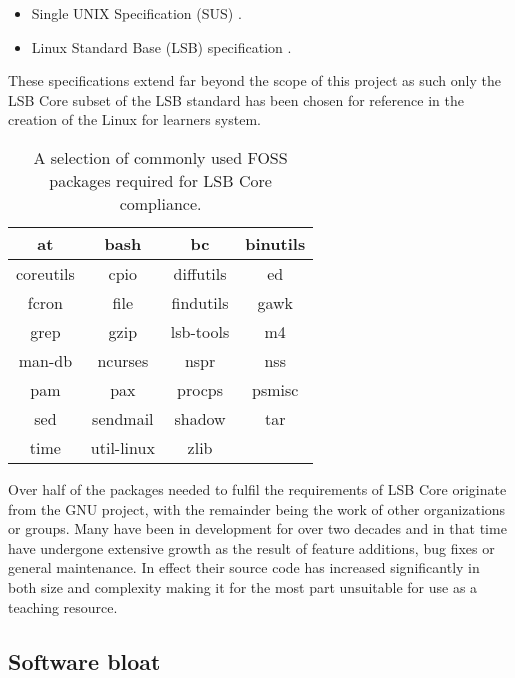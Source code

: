 \begin{itemize}
    \item Single UNIX Specification (SUS) \cite{susv4}.
    \item Linux Standard Base (LSB) specification \cite{lsb}.
\end{itemize}

These specifications extend far beyond the scope of this project as such only the LSB Core subset of the LSB standard has been chosen for reference in the creation of the Linux for learners system.

\begin{table}[H]
    \centering
        \begin{tabular}{|c|c|c|c|}
            \hline
            at & bash & bc & binutils \\
            \hline
            coreutils & cpio & diffutils & ed \\
            \hline
            fcron & file & findutils & gawk \\
            \hline
            grep & gzip & lsb-tools & m4 \\
            \hline
            man-db & ncurses & nspr & nss \\
            \hline
            pam & pax & procps & psmisc \\
            \hline
            sed & sendmail & shadow & tar \\
            \hline
            time & util-linux & zlib \\
            \cline{1-3}
        \end{tabular}
        \caption{A selection of commonly used FOSS packages required for LSB Core compliance.}
\end{table}

Over half of the packages needed to fulfil the requirements of LSB Core originate from the GNU project, with the remainder being the work of other organizations or groups. Many have been in development for over two decades and in that time have undergone extensive growth as the result of feature additions, bug fixes or general maintenance. In effect their source code has increased significantly in both size and complexity making it for the most part unsuitable for use as a teaching resource.

\subsection{Software bloat}

